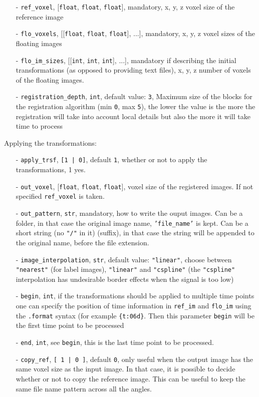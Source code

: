 \documentclass[10pt,a4paper]{book}
\newcommand{\option}[1]{{\texttt{'#1'}}}
\begin{document}
\begin{enumerate}
\item[-] \texttt{ref\_voxel}, [\texttt{float}, \texttt{float}, \texttt{float}], mandatory, x, y, z voxel size of the reference image
\item[-] \texttt{flo\_voxels}, [[\texttt{float}, \texttt{float}, \texttt{float}], ...], mandatory, x, y, z voxel sizes of the floating images
\item[-] \texttt{flo\_im\_sizes}, [[\texttt{int}, \texttt{int}, \texttt{int}], ...], mandatory if describing the initial transformations (as opposed to providing text files), x, y, z number of voxels of the floating images.
\item[-] \texttt{registration\_depth}, \texttt{int}, default value: \texttt{3}, Maximum size of the blocks for the registration algorithm (min \texttt{0}, max \texttt{5}), the lower the value is the more the registration will take into account local details but also the more it will take time to process
\end{enumerate}
Applying the transformations:
\begin{enumerate}
\item[-] \texttt{apply\_trsf}, \texttt{[1 | 0]}, default \texttt{1}, whether or not to apply the transformations, 1 yes.
\item[-] \texttt{out\_voxel}, [\texttt{float}, \texttt{float}, \texttt{float}], voxel size of the registered images. If not specified \texttt{ref\_voxel} is taken.
\item[-] \texttt{out\_pattern}, \texttt{str}, mandatory, how to write the ouput images. Can be a folder, in that case the original image name, \option{file\_name} is kept. Can be a short string (no \texttt{"/"} in it) (suffix), in that case the string will be appended to the original name, before the file extension.
\item[-] \texttt{image\_interpolation}, \texttt{str}, default value: \texttt{"linear"}, choose between \texttt{"nearest"} (for label images), \texttt{"linear"} and \texttt{"cspline"} (the \texttt{"cspline"} interpolation has undesirable border effects when the signal is too low)
\item[-] \texttt{begin}, \texttt{int}, if the transformations should be applied to multiple time points one can specify the position of time information in \texttt{ref\_im} and \texttt{flo\_im} using the \texttt{.format} syntax (for example \texttt{\{t:06d\}}. Then this parameter \texttt{begin} will be the first time point to be processed
\item[-] \texttt{end},  \texttt{int}, see \texttt{begin}, this is the last time point to be processed.
\item[-] \texttt{copy\_ref}, \texttt{[ 1 | 0 ]}, default \texttt{0}, only useful when the output image has the same voxel size as the input image. In that case, it is possible to decide whether or not to copy the reference image. This can be useful to keep the same file name pattern across all the angles.
\end{enumerate}
\end{document}
